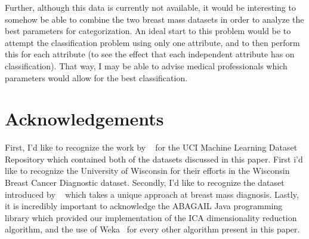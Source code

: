 \documentclass[annual]{acmsiggraph}
\begin{document}
Further, although this data is currently not available, it would be interesting to somehow be able to combine the two breast mass datasets in order to analyze the best parameters for categorization. An ideal start to this problem would be to attempt the classification problem using only one attribute, and to then perform this for each attribute (to see the effect that each independent attribute has on classification). That way, I may be able to advise medical professionals which parameters would allow for the best classification.
\section*{Acknowledgements}
First, I'd like to recognize the work by ~\cite{Frank+Asuncion:2010} for the UCI Machine Learning Dataset Repository which contained both of the datasets discussed in this paper. First i'd like to recognize the University of Wisconsin for their efforts in the Wisconsin Breast Cancer Diagnostic dataset. Secondly, I'd like to recognize the dataset introduced by ~\cite{elter2007prediction} which takes a unique approach at breast mass diagnosis. Lastly, it is incredibly important to acknowledge the ABAGAIL Java programming library which provided our implementation of the ICA dimensionality reduction algorithm, and the use of Weka~\cite{Hall_weka:2010} for every other algorithm present in this paper.


\end{document}

